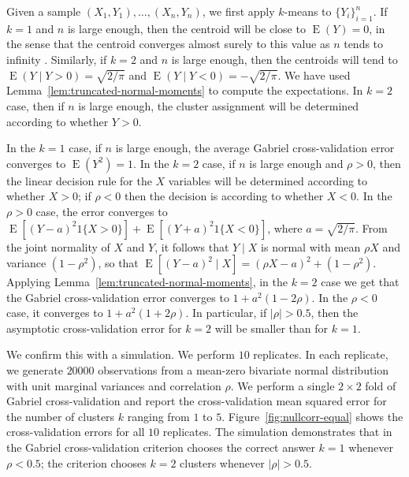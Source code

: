 \documentclass[11pt]{article}
\newcommand{\E}{\operatorname{E}}
\begin{document}
Given a sample $(X_1, Y_1), \dotsc, (X_n, Y_n)$, we first apply $k$-means to
$\{ Y_i \}_{i=1}^{n}$.  If $k = 1$ and $n$ is large enough, then the centroid
will be close to $\E(Y) = 0$, in the sense that the centroid converges almost
surely to this value as $n$ tends to infinity \citep{pollard1981strong}.
Similarly, if $k = 2$ and $n$ is large enough, then the centroids will tend to
$\E(Y \mid Y > 0) = \sqrt{2/\pi}$ and $\E(Y \mid Y < 0) = -\sqrt{2/\pi}$.  We
have used Lemma~\ref{lem:truncated-normal-moments} to compute the
expectations.  In $k = 2$ case, then if $n$ is large enough, the cluster
assignment will be determined according to whether $Y > 0$.


In the $k = 1$ case, if $n$ is large enough, the average Gabriel
cross-validation error converges to $\E(Y^2) = 1$. In the $k = 2$ case, if $n$
is large enough and $\rho > 0$, then the linear decision rule for the $X$
variables will be determined according to whether $X > 0$; if $\rho < 0$ then
the decision is according to whether $X < 0$.  In the $\rho > 0$ case, the
error converges to $\E[(Y - a)^2 1\{ X > 0\}] + \E[(Y + a)^2 1\{X < 0\}]$,
where $a = \sqrt{2/\pi}$.  From the joint normality of $X$ and $Y$, it follows
that $Y \mid X$ is normal with mean $\rho X$ and variance $(1 - \rho^2)$, so
that $\E[(Y - a)^2 \mid X] = (\rho X - a)^2 + (1 - \rho^2)$.  Applying
Lemma~\ref{lem:truncated-normal-moments}, in the $k = 2$ case we get that the
Gabriel cross-validation error converges to $1 + a^2 (1 - 2 \rho)$.  In the
$\rho < 0$ case, it converges to $1 + a^2 (1 + 2 \rho)$.  In particular, if
$|\rho| > 0.5$, then the asymptotic cross-validation error for $k = 2$ will be
smaller than for $k = 1$.


We confirm this with a simulation.  We perform $10$ replicates.  In each
replicate, we generate $20000$ observations from a mean-zero bivariate normal
distribution with unit marginal variances and correlation $\rho$.  We perform
a single $2 \times 2$ fold of Gabriel cross-validation and report the
cross-validation mean squared error for the number of clusters $k$ ranging
from $1$ to $5$.  Figure~\ref{fig:nullcorr-equal} shows the cross-validation
errors for all $10$ replicates.  The simulation demonstrates that in the
Gabriel cross-validation criterion chooses the correct answer $k = 1$ whenever
$\rho < 0.5$; the criterion chooses $k = 2$ clusters whenever $|\rho| > 0.5$.
\end{document}
